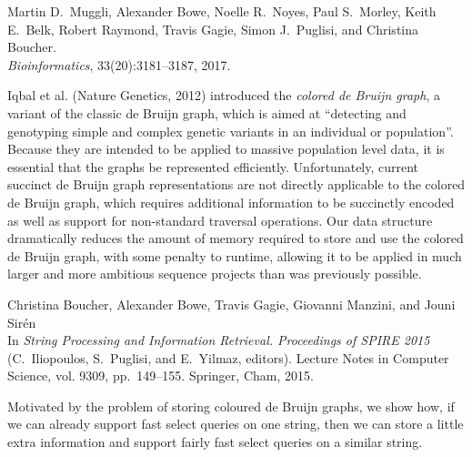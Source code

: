 {Martin D.~Muggli, Alexander Bowe, Noelle R.~Noyes, Paul S.~Morley, Keith E.~Belk, Robert Raymond, Travis Gagie, Simon J.~Puglisi, and Christina Boucher.\\
\textit{Bioinformatics}, 33(20):3181--3187, 2017.}

\noindent
Iqbal et al. (Nature Genetics, 2012) introduced the {\em colored de Bruijn graph}, a variant of the classic de Bruijn graph, which is aimed at ``detecting and genotyping simple and complex genetic variants in an individual or population''.
Because they are intended to be applied to massive population level data, it is essential that the graphs be represented efficiently.
Unfortunately, current succinct de Bruijn graph representations are not directly applicable to the colored de Bruijn graph, which requires additional information to be succinctly encoded as well as support for non-standard traversal operations.
Our data structure dramatically reduces the amount of memory required to store and use the colored de Bruijn graph, with some penalty to runtime, allowing it to be applied in much larger and more ambitious sequence projects than was previously possible.

{Christina Boucher, Alexander Bowe, Travis Gagie, Giovanni Manzini, and Jouni Sirén\\
In \textit{String Processing and Information Retrieval. Proceedings of SPIRE 2015} (C.~Iliopoulos, S.~Puglisi, and E.~Yilmaz, editors).
Lecture Notes in Computer Science, vol. 9309, pp.~149--155.
Springer, Cham, 2015.}

\noindent
Motivated by the problem of storing coloured de Bruijn graphs, we show how, if we can already support fast select queries on one string, then we can store a little extra information and support fairly fast select queries on a similar string.